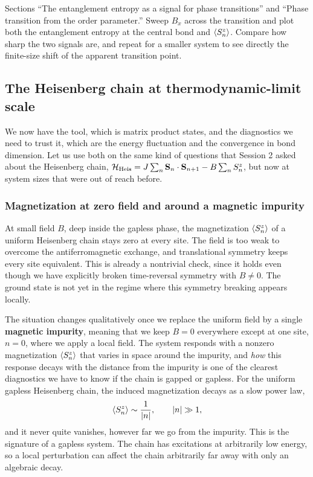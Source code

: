 \documentclass[lecture_notes.tex]{subfiles}
\begin{document}
\begin{notebook}
Sections ``The entanglement entropy as a signal for phase transitions'' and ``Phase transition
from the order parameter.'' Sweep $B_x$ across the transition and plot both the entanglement
entropy at the central bond and $\expval{S_n^z}$. Compare how sharp the two signals are, and repeat
for a smaller system to see directly the finite-size shift of the apparent transition point.
\end{notebook}

\subsection{The Heisenberg chain at thermodynamic-limit scale}
We now have the tool, which is matrix product states, and the diagnostics we need to trust it,
which are the energy fluctuation and the convergence in bond dimension. Let us use both on the same
kind of questions that Session 2 asked about the Heisenberg chain, $\mathcal{H}_{\mathrm{Heis}} = J\sum_n
\vb S_n\cdot\vb S_{n+1} - B\sum_n S_n^z$, but now at system sizes that were out of reach before.

\subsubsection{Magnetization at zero field and around a magnetic impurity}
At small field $B$, deep inside the gapless phase, the magnetization $\expval{S_n^z}$ of a uniform
Heisenberg chain stays zero at every site. The field is too weak to overcome the antiferromagnetic
exchange, and translational symmetry keeps every site equivalent. This is already a nontrivial
check, since it holds even though we have explicitly broken time-reversal symmetry with $B\ne0$.
The ground state is not yet in the regime where this symmetry breaking appears locally.

The situation changes qualitatively once we replace the uniform field by a single \textbf{magnetic
impurity}, meaning that we keep $B=0$ everywhere except at one site, $n=0$, where we apply a local
field. The system responds with a nonzero magnetization $\expval{S_n^z}$ that varies in space
around the impurity, and \emph{how} this response decays with the distance from the impurity is
one of the clearest diagnostics we have to know if the chain is gapped or gapless. For the uniform
gapless Heisenberg chain, the induced magnetization decays as a slow power law,
\begin{equation}
  \expval{S_n^z} \sim \frac{1}{|n|}, \qquad |n| \gg 1,
  \label{eq:powerlawdecay}
\end{equation}
and it never quite vanishes, however far we go from the impurity. This is the signature of a
gapless system. The chain has excitations at arbitrarily low energy, so a local perturbation can
affect the chain arbitrarily far away with only an algebraic decay.
\end{document}
